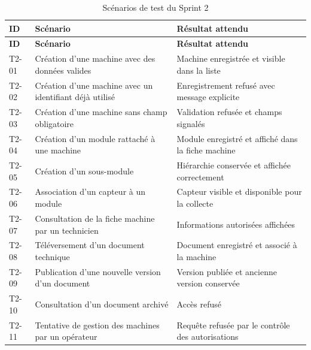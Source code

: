 {\footnotesize
\setlength{\tabcolsep}{4pt}
\begin{longtable}{|p{0.9cm}|p{8.6cm}|p{5.6cm}|}
\caption{Scénarios de test du Sprint 2}
\label{tab:tests-sprint2}\\
\hline
\textbf{ID} & \textbf{Scénario} & \textbf{Résultat attendu} \\
\hline
\endfirsthead

\hline
\textbf{ID} & \textbf{Scénario} & \textbf{Résultat attendu} \\
\hline
\endhead

T2-01 &
Création d'une machine avec des données valides &
Machine enregistrée et visible dans la liste \\
\hline

T2-02 &
Création d'une machine avec un identifiant déjà utilisé &
Enregistrement refusé avec message explicite \\
\hline

T2-03 &
Création d'une machine sans champ obligatoire &
Validation refusée et champs signalés \\
\hline

T2-04 &
Création d'un module rattaché à une machine &
Module enregistré et affiché dans la fiche machine \\
\hline

T2-05 &
Création d'un sous-module &
Hiérarchie conservée et affichée correctement \\
\hline

T2-06 &
Association d'un capteur à un module &
Capteur visible et disponible pour la collecte \\
\hline

T2-07 &
Consultation de la fiche machine par un technicien &
Informations autorisées affichées \\
\hline

T2-08 &
Téléversement d'un document technique &
Document enregistré et associé à la machine \\
\hline

T2-09 &
Publication d'une nouvelle version d'un document &
Version publiée et ancienne version conservée \\
\hline

T2-10 &
Consultation d'un document archivé &
Accès refusé \\
\hline

T2-11 &
Tentative de gestion des machines par un opérateur &
Requête refusée par le contrôle des autorisations \\
\hline

\end{longtable}}

